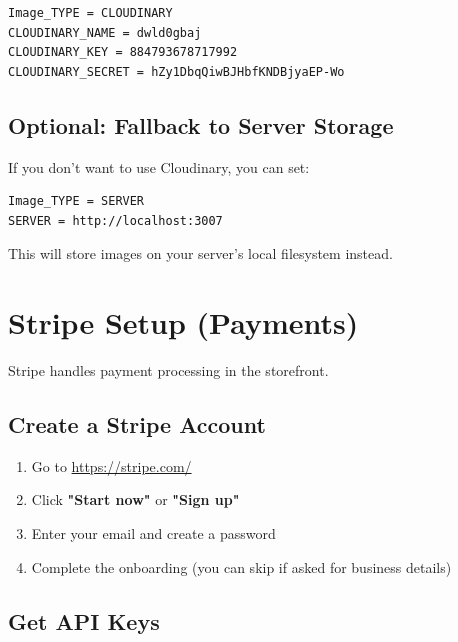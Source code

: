\documentclass[12pt,a4paper]{article}
\begin{document}
\begin{tcolorbox}[colback=yellow!10!white,colframe=warnyellow,title= Add to .env]
    \begin{lstlisting}
Image_TYPE = CLOUDINARY
CLOUDINARY_NAME = dwld0gbaj
CLOUDINARY_KEY = 884793678717992
CLOUDINARY_SECRET = hZy1DbqQiwBJHbfKNDBjyaEP-Wo
    \end{lstlisting}
\end{tcolorbox}

\subsection{Optional: Fallback to Server Storage}

If you don't want to use Cloudinary, you can set:

\begin{lstlisting}
Image_TYPE = SERVER
SERVER = http://localhost:3007
\end{lstlisting}

This will store images on your server's local filesystem instead.

\newpage

\section{Stripe Setup (Payments)}

Stripe handles payment processing in the storefront.

\subsection{Create a Stripe Account}

\begin{enumerate}[leftmargin=*,itemsep=0.5em]
    \item Go to \url{https://stripe.com/}
    \item Click \textbf{"Start now"} or \textbf{"Sign up"}
    \item Enter your email and create a password
    \item Complete the onboarding (you can skip if asked for business details)
\end{enumerate}

\subsection{Get API Keys}
\end{document}
